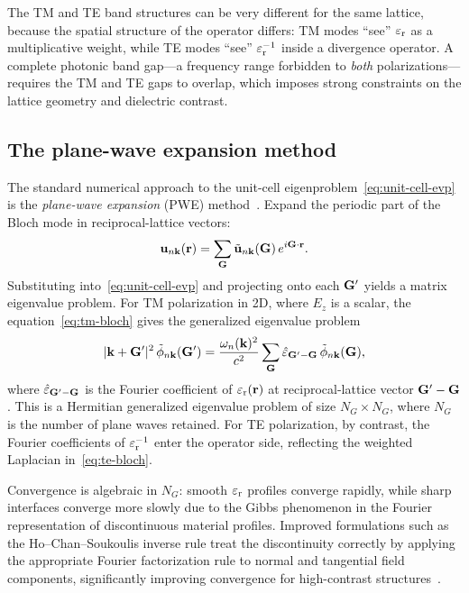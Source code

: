 \begin{remark}
The TM and TE band structures can be very different for the same lattice,
because the spatial structure of the operator differs: TM modes ``see''
$\varepsilon_{\mathrm{r}}$ as a multiplicative weight, while TE modes ``see''
$\varepsilon_{\mathrm{r}}^{-1}$ inside a divergence operator. A complete photonic band
gap---a frequency range forbidden to \emph{both} polarizations---requires
the TM and TE gaps to overlap, which imposes strong constraints on the
lattice geometry and dielectric contrast.
\end{remark}


\subsection{The plane-wave expansion method}
\label{ssec:pwe}

The standard numerical approach to the unit-cell eigenproblem~\eqref{eq:unit-cell-evp} is the
\emph{plane-wave expansion} (PWE) method~\cite{wu2015scheme,hsu2016bound}. Expand the periodic part of
the Bloch mode in reciprocal-lattice vectors:
\begin{equation}
 \mathbf{u}_{n\mathbf{k}}(\mathbf{r})
 = \sum_{\mathbf{G}} \tilde{\mathbf{u}}_{n\mathbf{k}}(\mathbf{G})\,e^{i\mathbf{G}\cdot\mathbf{r}}.
 \label{eq:pwe-expansion}
\end{equation}
Substituting into~\eqref{eq:unit-cell-evp} and projecting onto each
$\mathbf{G}'$ yields a matrix eigenvalue problem. For TM polarization in 2D,
where $E_z$ is a scalar, the equation~\eqref{eq:tm-bloch} gives the
generalized eigenvalue problem
\begin{equation}
 |\mathbf{k} + \mathbf{G}'|^2\,
 \tilde{\phi}_{n\mathbf{k}}(\mathbf{G}')
 =
 \frac{\omega_n(\mathbf{k})^2}{c^2}
 \sum_{\mathbf{G}}
 \hat{\varepsilon}_{\mathbf{G}'-\mathbf{G}}\,
 \tilde{\phi}_{n\mathbf{k}}(\mathbf{G}),
 \label{eq:pwe-tm}
\end{equation}
where $\hat{\varepsilon}_{\mathbf{G}'-\mathbf{G}}$ is the Fourier coefficient of
$\varepsilon_{\mathrm{r}}(\mathbf{r})$ at reciprocal-lattice vector $\mathbf{G}' - \mathbf{G}$. This is a
Hermitian generalized eigenvalue problem of size $N_G \times N_G$, where
$N_G$ is the number of plane waves retained. For TE polarization, by
contrast, the Fourier coefficients of $\varepsilon_{\mathrm{r}}^{-1}$ enter the operator
side, reflecting the weighted Laplacian in~\eqref{eq:te-bloch}.

Convergence is algebraic in $N_G$: smooth $\varepsilon_{\mathrm{r}}$ profiles converge
rapidly, while sharp interfaces converge more slowly due to the Gibbs
phenomenon in the Fourier representation of discontinuous material
profiles.
Improved formulations such as the Ho--Chan--Soukoulis inverse rule treat
the discontinuity correctly by applying the appropriate Fourier
factorization rule to normal and tangential field components, significantly
improving convergence for high-contrast structures~\cite{paz2019tutorial}.

